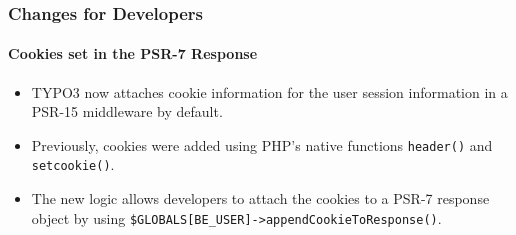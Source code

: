 %

\begin{frame}[fragile]
	\frametitle{Changes for Developers}
	\framesubtitle{Cookies set in the PSR-7 Response}

	\begin{itemize}
		\item TYPO3 now attaches cookie information for the user session information
			in a PSR-15 middleware by default.
		\item Previously, cookies were added using PHP's native functions\newline
			\smaller\texttt{header()} and \texttt{setcookie()}\normalsize.
		\item The new logic allows developers to attach the cookies to a PSR-7
			response object by using\newline
			\smaller\texttt{\$GLOBALS[BE\_USER]->appendCookieToResponse()}\normalsize.
	\end{itemize}
\end{frame}

